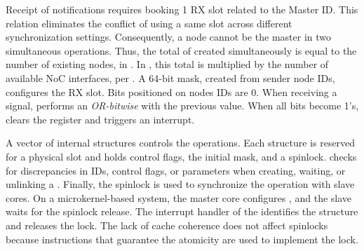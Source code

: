 

				Receipt of notifications requires booking 1 \cnoc RX slot related to the Master ID. This relation eliminates the conflict of using a same slot across different synchronization settings. Consequently, a node cannot be the master in two simultaneous operations. Thus, the total of \sync created simultaneously is equal to the number of existing nodes,  in \mppa. In \ioclusters, this total is multiplied by the number of available NoC interfaces,  per \dma. A 64-bit mask, created from sender node IDs, configures the RX slot. Bits positioned on nodes IDs are 0. When receiving a signal, \dma performs an \textit{OR-bitwise} with the previous value. When all bits become 1's, \dma clears the register and triggers an interrupt.

				A vector of internal structures controls the operations. Each structure is reserved for a physical slot and holds control flags, the initial mask, and a spinlock. \hal checks for discrepancies in IDs, control flags, or parameters when creating, waiting, or unlinking a \sync. Finally, the spinlock is used to synchronize the operation with slave cores. On a microkernel-based system, the master core configures \sync, and the slave waits for the spinlock release. The interrupt handler of the \sync identifies the structure and releases the lock. The lack of cache coherence does not affect spinlocks because instructions that guarantee the atomicity are used to implement the lock.

